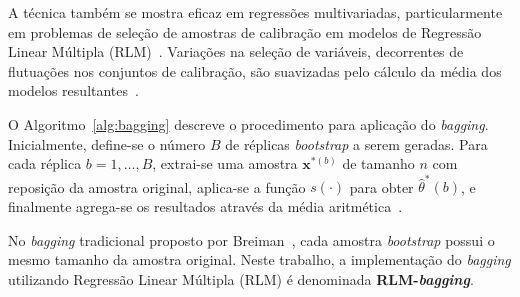 A técnica também se mostra eficaz em regressões multivariadas, particularmente em problemas de seleção de amostras de calibração em modelos de Regressão Linear Múltipla (RLM)~\cite{kumari2024,HARDLE:2007}. Variações na seleção de variáveis, decorrentes de flutuações nos conjuntos de calibração, são suavizadas pelo cálculo da média dos modelos resultantes~\cite{MARTINS:2006}.

\begin{center}
\begin{minipage}{0.95\textwidth}
\centering %
\end{minipage}
\end{center}


O Algoritmo~\ref{alg:bagging} descreve o procedimento para aplicação do \textit{bagging}. Inicialmente, define-se o número $B$ de réplicas \textit{bootstrap} a serem geradas. Para cada réplica $b = 1, \ldots, B$, extrai-se uma amostra $\mathbf{x}^{*(b)}$ de tamanho $n$ com reposição da amostra original, aplica-se a função $s(\cdot)$ para obter $\hat{\theta}^{*}(b)$, e finalmente agrega-se os resultados através da média aritmética~\cite{BAUER:1999}. 

No \textit{bagging} tradicional proposto por Breiman~\cite{BREIMAN:2001}, cada amostra \textit{bootstrap} possui o mesmo tamanho da amostra original. Neste trabalho, a implementação do \textit{bagging} utilizando Regressão Linear Múltipla (RLM) é denominada \textbf{RLM-\textit{bagging}}.

